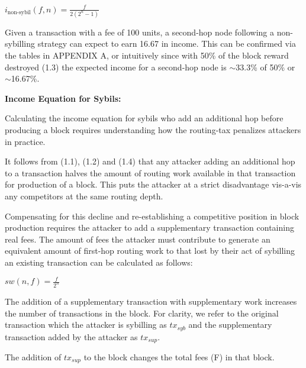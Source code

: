 \documentclass[oneside]{article}   	%
\begin{document}
\begin{multicols}{2}
\begin{adjustwidth}{1.5em}{1.5em}
	\begin{math}
i_{\text{non-sybil}}(f, n) = \frac{f}{2(2^n - 1)}
	\end{math}
\end{adjustwidth}
\normalsize

Given a transaction with a fee of 100 units, a second-hop node following a non-sybilling strategy can expect to earn 16.67 in income. This can be confirmed via the tables in APPENDIX A, or intuitively since with 50\% of the block reward destroyed (1.3) the expected income for a second-hop node is $\sim$33.3\% of 50\% or $\sim$16.67\%.

\textbf{Income Equation for Sybils:}

Calculating the income equation for sybils who add an additional hop before producing a block requires understanding how the routing-tax penalizes attackers in practice.

It follows from (1.1), (1.2) and (1.4) that any attacker adding an additional hop to a transaction halves the amount of routing work available in that transaction for production of a block. This puts the attacker at a strict disadvantage vis-a-vis any competitors at the same routing depth.

Compensating for this decline and re-establishing a competitive position in block production requires the attacker to add a supplementary transaction containing real fees. The amount of fees the attacker must contribute to generate an equivalent amount of first-hop routing work to that lost by their act of sybilling an existing transaction can be calculated as follows:

\large
\begin{adjustwidth}{1.5em}{1.5em} 
	\begin{math}
sw(n, f) = \frac{f}{2^n}
	\end{math}
\end{adjustwidth}
\normalsize

The addition of a supplementary transaction with supplementary work increases the number of transactions in the block. For clarity, we refer to the original transaction which the attacker is sybilling as \begin{math}tx_{syb}\end{math} and the supplementary transaction added by the attacker as \begin{math}tx_{sup}\end{math}.

The addition of \begin{math}tx_{sup}\end{math} to the block changes the total fees (F) in that block.


\end{multicols}
\end{document}
